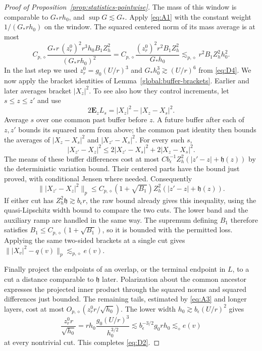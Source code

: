 \begin{proof}[Proof of Proposition~\ref{prop:statistics-pointwise}]
The mass of this window is comparable to $G_*rh_0$, and
$\sup G\lesssim G_*$.  Apply \eqref{eq:A1} with the constant weight
$1/(G_*rh_0)$ on the window.  The squared centered norm of its mass
average is at most
\begin{equation*}
 C_{p,\diamond}
 \frac{G_*r\,(z_r^0)^2r^3h_0B_1Z_h^2}{(G_*rh_0)^2}
 = C_{p,\diamond}\frac{(z_r^0)^2r^2B_1Z_h^2}{G_*h_0}
 \lesssim_{p,\diamond}r^2B_1Z_h^2h_0^2.
\end{equation*}
In the last step we used $z_r^0=g_0(U/r)^3$ and
$G_*h_0^3\gtrsim(U/r)^6$ from \eqref{eq:D4}.
We now apply the bracket identities of
Lemma~\ref{global:buffer-brackets}. Earlier and later averages bracket
$|X_z|^2$. To see also
how they control increments, let $s\le z\le z'$ and use
\[
 2\mathbf E_zL_s=|X_z|^2-|X_z-X_s|^2.
\]
Average $s$ over one common past buffer before $z$.  A future buffer
after each of $z,z'$ bounds its squared norm from above; the common
past identity then bounds the averages of $|X_z-X_s|^2$ and
$|X_{z'}-X_s|^2$.  For every such $s$,
\[
 |X_{z'}-X_z|^2
 \le2|X_{z'}-X_s|^2+2|X_z-X_s|^2.
\]
The means of these buffer differences cost at most
$Cb_\epsilon^{-1}Z_h^2(|z'-z|+\mathfrak h(z))$ by the deterministic
variation bound.  Their centered parts have the bound just proved,
with conditional Jensen where needed.  Consequently
\[
 \||X_{z'}-X_z|^2\|_p
 \le C_{p,\diamond}(1+\sqrt{B_1})
       Z_h^2(|z'-z|+\mathfrak h(z)).
\]
If either cut has $Z_h^2\mathfrak h\gtrsim b_\epsilon r$, the raw bound
already gives this inequality, using the quasi-Lipschitz width bound
to compare the two cuts.  The lower band and the auxiliary ramp are
handled in the same way.  The supremum defining $B_1$ therefore
satisfies $B_1\le C_{p,\diamond}(1+\sqrt{B_1})$, so it is bounded with
the permitted loss.  Applying the same two-sided brackets at a single
cut gives $\||X_v|^2-q(v)\|_p\lesssim_{p,\diamond}e(v)$.

Finally project the endpoints of an overlap, or the terminal
endpoint in $L$, to a cut a distance comparable to $\mathfrak h$ later.
Polarization about the common ancestor expresses the projected inner
product through the squared norms and squared differences just bounded.
The remaining tails, estimated by \eqref{eq:A3} and longer layers,
cost at most $O_{p,\diamond}(z_r^0r/\sqrt{h_0})$.  The lower width
$h_0\gtrsim b_\epsilon(U/r)^2$ gives
\[
 \frac{z_r^0r}{\sqrt{h_0}}
 =rh_0\frac{g_0(U/r)^3}{h_0^{3/2}}
 \lesssim b_\epsilon^{-3/2}g_0rh_0
 \lesssim_\diamond e(v)
\]
at every nontrivial cut.  This completes \eqref{eq:D2}.
\end{proof}

